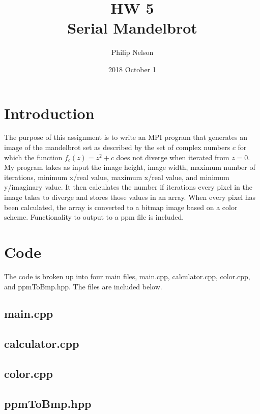\documentclass{article}
\title{HW 5 \\ Serial Mandelbrot}
\author{Philip Nelson}
\date{2018 October 1}
\begin{document}
\maketitle

\section*{Introduction}

The purpose of this assignment is to write an MPI program that generates an image of the mandelbrot set as described by the set of complex numbers $c$ for which the function ${f_{c}(z)=z^{2}+c}$ does not diverge when iterated from $z=0$. My program takes as input the image height, image width, maximum number of iterations, minimum x/real value, maximum x/real value, and minimum y/imaginary value. It then calculates the number if iterations every pixel in the image takes to diverge and stores those values in an array. When every pixel has been calculated, the array is converted to a bitmap image based on a color scheme. Functionality to output to a ppm file is included.

\section*{Code}
The code is broken up into four main files, main.cpp, calculator.cpp, color.cpp, and ppmToBmp.hpp. The files are included below.

\bigskip

\subsection{main.cpp}


\subsection{calculator.cpp}


\subsection{color.cpp}


\subsection{ppmToBmp.hpp}

\newpage
\end{document}
